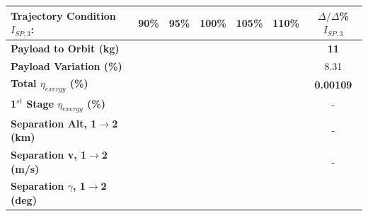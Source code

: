 \begin{table}[ht]

	\centering
	\begin{tabular}{l c c c c c c} 
		\hline \textbf{Trajectory Condition}   \qquad  $I_{SP,3}$:
		&90\%
		&95\%
		&100\%
		&105\%
		&110\%
		& $\Delta/\Delta$\%$I_{SP,3}$
		\\
		\hline \textbf{Payload to Orbit (kg)}
		& \textbf{\PayloadToOrbitISPThreeNinety}
		& \textbf{\PayloadToOrbitISPThreeNinetyFive}
		& \textbf{\PayloadToOrbitISPThreeStandard}
		& \textbf{\PayloadToOrbitISPThreeOneHundredFive}
		& \textbf{\PayloadToOrbitISPThreeOneHundredTen}
		&\textbf{11}
		\\
		\textbf{Payload Variation (\%)}
		& \PayloadVarISPThreeNinety
		& \PayloadVarISPThreeNinetyFive
		& \PayloadVarISPThreeStandard
		& \PayloadVarISPThreeOneHundredFive
		& \PayloadVarISPThreeOneHundredTen
		&8.31
		\\
		\textbf{Total $\eta_{exergy}$ (\%)}
		& \textbf{\totalExergyEffISPThreeNinety}
		& \textbf{\totalExergyEffISPThreeNinetyFive}
		& \textbf{\totalExergyEffISPThreeStandard}
		& \textbf{\totalExergyEffISPThreeOneHundredFive}
		& \textbf{\totalExergyEffISPThreeOneHundredTen}
		& \textbf{0.00109}
		\\
		\hline 
		\textbf{1$^{st}$ Stage $\eta_{exergy}$ (\%)}
		& \textbf{\firstExergyEffISPThreeNinety}
		& \textbf{\firstExergyEffISPThreeNinetyFive}
		& \textbf{\firstExergyEffISPThreeStandard}
		& \textbf{\firstExergyEffISPThreeOneHundredFive}
		& \textbf{\firstExergyEffISPThreeOneHundredTen}
		& -
		\\
		\textbf{Separation Alt, 1$\rightarrow$2 (km)}
		& \firstsecondSeparationAltISPThreeNinety
		& \firstsecondSeparationAltISPThreeNinetyFive
		& \firstsecondSeparationAltISPThreeStandard
		& \firstsecondSeparationAltISPThreeOneHundredFive
		& \firstsecondSeparationAltISPThreeOneHundredTen
		& -
		\\
		\textbf{Separation v, 1$\rightarrow$2 (m/s)}
		& \firstsecondSeparationvISPThreeNinety
		& \firstsecondSeparationvISPThreeNinetyFive
		& \firstsecondSeparationvISPThreeStandard
		& \firstsecondSeparationvISPThreeOneHundredFive
		& \firstsecondSeparationvISPThreeOneHundredTen
		& -
		\\
		\textbf{Separation $\gamma$, 1$\rightarrow$2 (deg)}
		& \firstsecondSeparationgammaISPThreeNinety
		& \firstsecondSeparationgammaISPThreeNinetyFive
		& \firstsecondSeparationgammaISPThreeStandard
		& \firstsecondSeparationgammaISPThreeOneHundredFive
		& \firstsecondSeparationgammaISPThreeOneHundredTen

\end{tabular}
\end{table}
